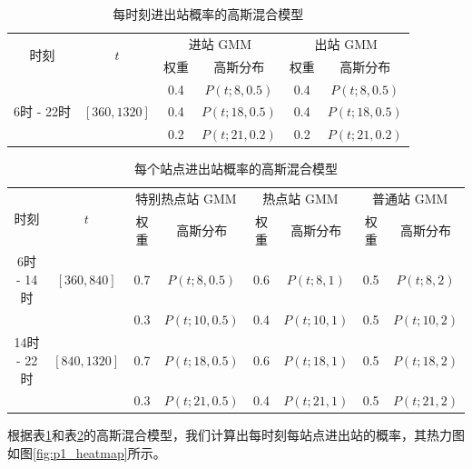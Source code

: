 \documentclass[12pt,a4paper]{mcmthesis}
\begin{document}
    \begin{table}[h]
        \centering
        \caption{每时刻进出站概率的高斯混合模型}
        \label{tab:p1_gmm-time}
        \begin{tabular}{c|c|cc|cc}
            \hline
            \multirow{2}{*}{时刻} & \multirow{2}{*}{$t$} & \multicolumn{2}{c|}{进站 GMM} & \multicolumn{2}{c}{出站 GMM} \\ \cline{3-6}
            &                         & 权重  & 高斯分布          & 权重  & 高斯分布          \\ \hline
            &                         & 0.4 & $P(t;8,0.5)$  & 0.4 & $P(t;8,0.5)$  \\
            6时 - 22时 & $\left[360,1320\right]$ & 0.4 & $P(t;18,0.5)$ & 0.4 & $P(t;18,0.5)$ \\
            &                         & 0.2 & $P(t;21,0.2)$ & 0.2 & $P(t;21,0.2)$ \\ \hline
        \end{tabular}
    \end{table}

    \begin{table}[h]
        \centering
        \caption{每个站点进出站概率的高斯混合模型}
        \label{tab:p1_gmm-station}
        \begin{tabular}{c|c|cc|cc|cc}
            \hline
            \multirow{2}{*}{时刻} & \multirow{2}{*}{$t$} & \multicolumn{2}{c|}{特别热点站 GMM} & \multicolumn{2}{c}{热点站 GMM}
            & \multicolumn{2}{c}{普通站 GMM}
            \\ \cline{3-6}
            &                         & 权重  & 高斯分布          & 权重  & 高斯分布        & 权重  & 高斯分布        \\ \hline
            6时 - 14时  & $\left[360,840\right]$  & 0.7 & $P(t;8,0.5)$  & 0.6 & $P(t;8,1)$  & 0.5 & $P(t;8,2)$  \\
            &                         & 0.3 & $P(t;10,0.5)$ & 0.4 & $P(t;10,1)$ & 0.5 & $P(t;10,2)$ \\
            14时 - 22时 & $\left[840,1320\right]$ & 0.7 & $P(t;18,0.5)$ & 0.6 & $P(t;18,1)$ & 0.5 & $P(t;18,2)$ \\
            &                         & 0.3 & $P(t;21,0.5)$ & 0.4 & $P(t;21,1)$ & 0.5 & $P(t;21,2)$ \\ \hline
        \end{tabular}
    \end{table}

    根据表\ref{tab:p1_gmm-time}和表\ref{tab:p1_gmm-station}的高斯混合模型，我们计算出每时刻每站点进出站的概率，其热力图如图\ref{fig:p1_heatmap}所示。
\end{document}
